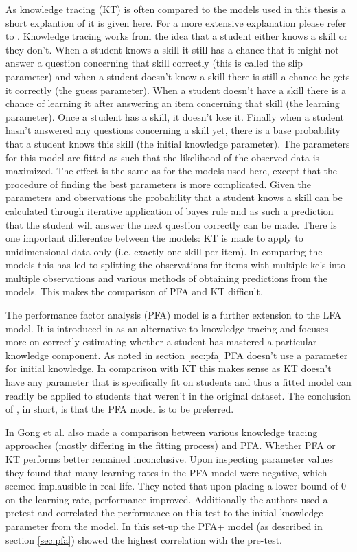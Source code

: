 \documentclass{scrartcl}
\begin{document}
As knowledge tracing (KT) is often compared to the models used in this thesis a short explantion of it is given here. For a more extensive explanation please refer to \cite{kt}. Knowledge tracing works from the idea that a student either knows a skill or they don't. When a student knows a skill it still has a chance that it might not answer a question concerning that skill correctly (this is called the slip parameter) and when a student doesn't know a skill there is still a chance he gets it correctly (the guess parameter). When a student doesn't have a skill there is a chance of learning it after answering an item concerning that skill (the learning parameter). Once a student has a skill, it doesn't lose it. Finally when a student hasn't answered any questions concerning a skill yet, there is a base probability that a student knows this skill (the initial knowledge parameter). The parameters for this model are fitted as such that the likelihood of the observed data is maximized. The effect is the same as for the models used here, except that the procedure of finding the best parameters is more complicated. Given the parameters and observations the probability that a student knows a skill can be calculated through iterative application of bayes rule and as such a prediction that the student will answer the next question correctly can be made. There is one important differentce between the models: KT is made to apply to unidimensional data only (i.e. exactly one skill per item). In comparing the models this has led to splitting the observations for items with multiple kc's into multiple observations and various methods of obtaining predictions from the models. This makes the comparison of PFA and KT difficult.

The performance factor analysis (PFA) model is a further extension to the LFA model. It is introduced in \cite{pfa} as an alternative to knowledge tracing and focuses more on correctly estimating whether a student has mastered a particular knowledge component. As noted in section \ref{sec:pfa} PFA doesn't use a parameter for initial knowledge. In comparison with KT this makes sense as KT doesn't have any parameter that is specifically fit on students and thus a fitted model can readily be applied to students that weren't in the original dataset. The conclusion of \cite{pfa}, in short, is that the PFA model is to be preferred.

In \cite{ktpfa} Gong et al. also made a comparison between various knowledge tracing approaches (mostly differing in the fitting process) and PFA. Whether PFA or KT performs better remained inconclusive. Upon inspecting parameter values they found that many learning rates in the PFA model were negative, which seemed implausible in real life. They noted that upon placing a lower bound of 0 on the learning rate, performance improved.  Additionally the authors used a pretest and correlated the performance on this test to the initial knowledge parameter from the model. In this set-up the PFA+ model (as described in section \ref{sec:pfa}) showed the highest correlation with the pre-test.
\end{document}
